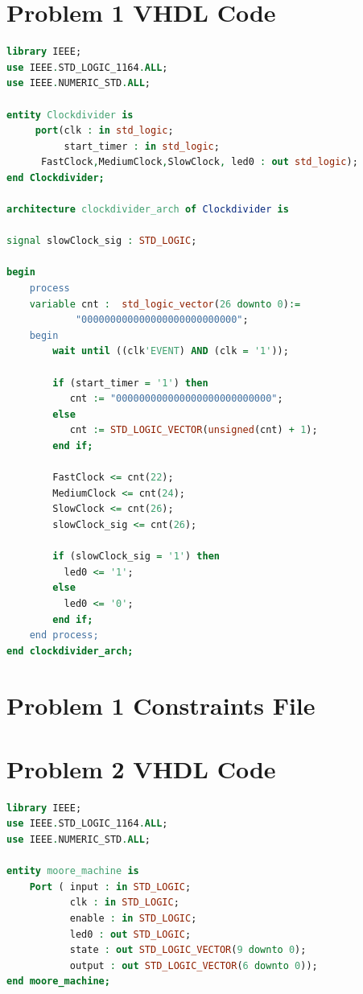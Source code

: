 \documentclass[11pt]{article}
\begin{document}
\begin{appendices}

\section{Problem 1 VHDL Code}

\begin{lstlisting}[language=VHDL]
library IEEE;
use IEEE.STD_LOGIC_1164.ALL;
use IEEE.NUMERIC_STD.ALL;

entity Clockdivider is
     port(clk : in std_logic;
          start_timer : in std_logic;
	  FastClock,MediumClock,SlowClock, led0 : out std_logic);
end Clockdivider;

architecture clockdivider_arch of Clockdivider is

signal slowClock_sig : STD_LOGIC;

begin
    process  
    variable cnt :	std_logic_vector(26 downto 0):= 
    		"000000000000000000000000000";
    begin					 
        wait until ((clk'EVENT) AND (clk = '1'));
	       
		if (start_timer = '1') then
	       cnt := "000000000000000000000000000";
	    else  
           cnt := STD_LOGIC_VECTOR(unsigned(cnt) + 1);
	    end if;

   	    FastClock <= cnt(22);
   	    MediumClock <= cnt(24);	
   	    SlowClock <= cnt(26);
        slowClock_sig <= cnt(26);
	
        if (slowClock_sig = '1') then
		  led0 <= '1';
	    else
		  led0 <= '0';
	    end if;
	end process;
end clockdivider_arch;
\end{lstlisting}

\section{Problem 1 Constraints File}

\section{Problem 2 VHDL Code}
\begin{lstlisting}[language=VHDL]
library IEEE;
use IEEE.STD_LOGIC_1164.ALL;
use IEEE.NUMERIC_STD.ALL;

entity moore_machine is
    Port ( input : in STD_LOGIC;
           clk : in STD_LOGIC;
           enable : in STD_LOGIC;
           led0 : out STD_LOGIC;
           state : out STD_LOGIC_VECTOR(9 downto 0);
           output : out STD_LOGIC_VECTOR(6 downto 0));
end moore_machine;


\end{lstlisting}
\end{appendices}
\end{document}
